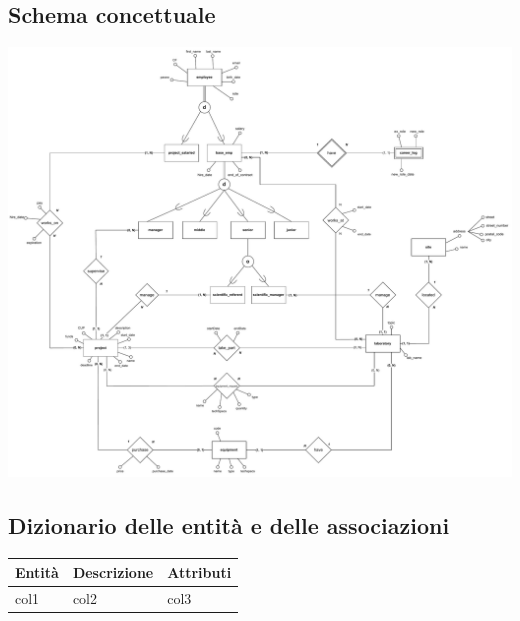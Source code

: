 \subsection{Schema concettuale}\bigskip
\includegraphics[width=\textwidth]{images/concettualeER.drawio.pdf}

\newpage
\subsection{Dizionario delle entità e delle associazioni}
\begin{tabular}{@{}| l | l | l |}
	\hline
	Entità & Descrizione & Attributi \\
	\hline
	col1   & col2        & col3      \\
	\hline
\end{tabular}
